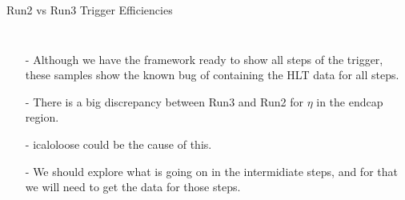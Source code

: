 \documentclass[aspectratio=1610,8pt]{beamer}					%
\begin{document}
\begin{frame}{Run2 vs Run3 Trigger Efficiencies}
\begin{columns}
        \begin{itemize}
            \item [-] 
                Although we have the framework ready to show all steps of the trigger,
                these samples show the known bug of containing the HLT data for all steps.
            \item [-]
                There is a big discrepancy between Run3 and Run2 for $\eta$ in the endcap region. 
            \item [-]
                icaloloose could be the cause of this.
            \item [-]
                We should explore what is going on in the intermidiate steps,
                and for that we will need to get the data for those steps.
        \end{itemize}
    \end{columns}
\end{frame}
\end{document}
